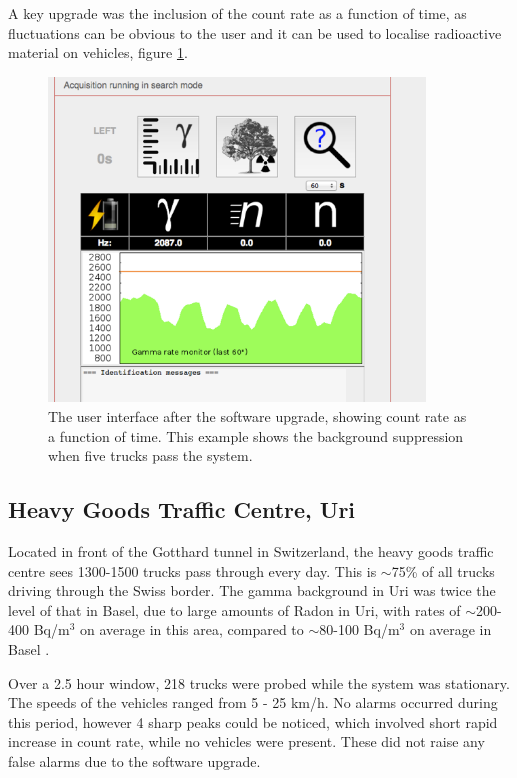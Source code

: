 A key upgrade was the inclusion of the count rate as a function of time, as fluctuations can be obvious to the user and it can be used to localise radioactive material on vehicles, figure \ref{fig:softwareUpgrade}.

\begin{figure}
\begin{center}
\includegraphics[width=100mm]{./Chapter7/figures/softwareUpdate.png}
\end{center}
\caption{The user interface after the software upgrade, showing count rate as a function of time. This example shows the background suppression when five trucks pass the system.}
\label{fig:softwareUpgrade}
\end{figure}

\subsection{Heavy Goods Traffic Centre, Uri}
Located in front of the Gotthard tunnel in Switzerland, the heavy goods traffic centre sees 1300-1500 trucks pass through every day. This is $\sim$75\% of all trucks driving through the Swiss border. The gamma background in Uri was twice the level of that in Basel, due to large amounts of Radon in Uri, with rates of $\sim$200-400 Bq/m$^{3}$ on average in this area, compared to $\sim$80-100 Bq/m$^{3}$ on average in Basel \cite{swissRadonLevels}.

Over a 2.5 hour window, 218 trucks were probed while the system was stationary. The speeds of the vehicles ranged from 5 - 25 km/h. No alarms occurred during this period, however 4 sharp peaks could be noticed, which involved short rapid increase in count rate, while no vehicles were present. These did not raise any false alarms due to the software upgrade.


